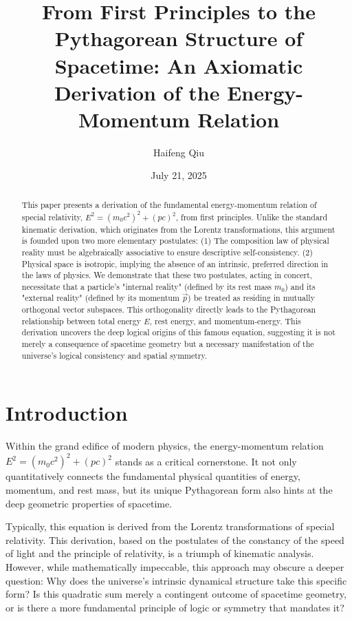 \documentclass[12pt, a4paper]{article}
\title{\textbf{From First Principles to the Pythagorean Structure of Spacetime: An Axiomatic Derivation of the Energy-Momentum Relation}}
\author{Haifeng Qiu}
\date{July 21, 2025}
\begin{document}
\maketitle

\begin{abstract}
\noindent This paper presents a derivation of the fundamental energy-momentum relation of special relativity, $E^2 = (m_0c^2)^2 + (pc)^2$, from first principles. Unlike the standard kinematic derivation, which originates from the Lorentz transformations, this argument is founded upon two more elementary postulates: (1) The composition law of physical reality must be algebraically associative to ensure descriptive self-consistency. (2) Physical space is isotropic, implying the absence of an intrinsic, preferred direction in the laws of physics. We demonstrate that these two postulates, acting in concert, necessitate that a particle's "internal reality" (defined by its rest mass $m_0$) and its "external reality" (defined by its momentum $\vec{p}$) be treated as residing in mutually orthogonal vector subspaces. This orthogonality directly leads to the Pythagorean relationship between total energy $E$, rest energy, and momentum-energy. This derivation uncovers the deep logical origins of this famous equation, suggesting it is not merely a consequence of spacetime geometry but a necessary manifestation of the universe's logical consistency and spatial symmetry.
\end{abstract}

\section{Introduction}

Within the grand edifice of modern physics, the energy-momentum relation $E^2 = (m_0c^2)^2 + (pc)^2$ stands as a critical cornerstone. It not only quantitatively connects the fundamental physical quantities of energy, momentum, and rest mass, but its unique Pythagorean form also hints at the deep geometric properties of spacetime.

Typically, this equation is derived from the Lorentz transformations of special relativity. This derivation, based on the postulates of the constancy of the speed of light and the principle of relativity, is a triumph of kinematic analysis. However, while mathematically impeccable, this approach may obscure a deeper question: Why does the universe's intrinsic dynamical structure take this specific form? Is this quadratic sum merely a contingent outcome of spacetime geometry, or is there a more fundamental principle of logic or symmetry that mandates it?
\end{document}
